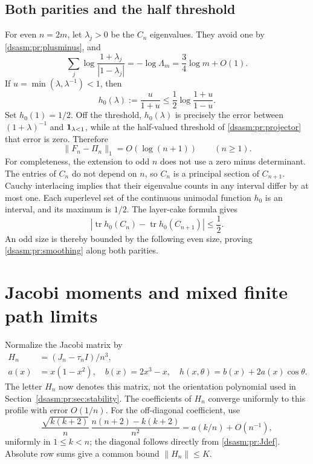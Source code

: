 \documentclass[11pt,letterpaper]{article}
\theoremstyle{remark}\newtheorem{remark}[theorem]{Remark}
\DeclareMathOperator{\tr}{tr}\DeclareMathOperator{\Ran}{Ran}
\begin{document}
\subsection{Both parities and the half threshold}
For even $n=2m$, let $\lambda_j>0$ be the $C_n$ eigenvalues. They
avoid one by \eqref{dsasm:pr:plusminus}, and
\[
 \sum_j\log\frac{1+\lambda_j}{|1-\lambda_j|}
 =-\log\Lambda_m=\frac34\log m+O(1).
\]
If $u=\min(\lambda,\lambda^{-1})<1$, then
\[
 h_0(\lambda):=\frac{u}{1+u}
 \le\frac12\log\frac{1+u}{1-u}.
\]
Set $h_0(1)=1/2$. Off the threshold, $h_0(\lambda)$ is precisely the
error between $(1+\lambda)^{-1}$ and $\mathbf1_{\lambda<1}$, while at
the half-valued threshold of \eqref{dsasm:pr:projector} that error is zero.
Therefore
\begin{equation}\label{dsasm:pr:smoothing}
 \|F_n-\Pi_n\|_1=O(\log(n+1))\qquad(n\ge1).
\end{equation}
For completeness, the extension to odd $n$ does not use a zero
minus determinant. The entries of $C_n$ do not depend on $n$, so
$C_n$ is a principal section of $C_{n+1}$. Cauchy interlacing implies
that their eigenvalue counts in any interval differ by at most one.
Each superlevel set of the continuous unimodal function $h_0$ is an
interval, and its maximum is $1/2$. The layer-cake formula gives
\[
 |\tr h_0(C_n)-\tr h_0(C_{n+1})|\le\frac12.
\]
An odd size is thereby bounded by the following even size, proving
\eqref{dsasm:pr:smoothing} along both parities.
\section{Jacobi moments and mixed finite path limits}
\label{dsasm:pr:sec:moments}
Normalize the Jacobi matrix by
\begin{equation}\label{dsasm:pr:Hprofile}
\begin{split}
 H_n&=(J_n-\tau_nI)/n^3,\\
 a(x)&=x(1-x^2),\quad b(x)=2x^3-x,\quad
 h(x,\theta)=b(x)+2a(x)\cos\theta.
\end{split}
\end{equation}
The letter $H_n$ now denotes this matrix, not the orientation polynomial
used in Section~\ref{dsasm:pr:sec:stability}. The coefficients of $H_n$ converge
uniformly to this profile with error $O(1/n)$. For the off-diagonal
coefficient, use
\[
 \frac{\sqrt{k(k+2)}}n\,
 \frac{n(n+2)-k(k+2)}{n^2}
 =a(k/n)+O(n^{-1}),
\]
uniformly in $1\le k<n$; the diagonal follows directly from
\eqref{dsasm:pr:Jdef}. Absolute row sums give a common bound $\|H_n\|\le K$.
\end{document}
